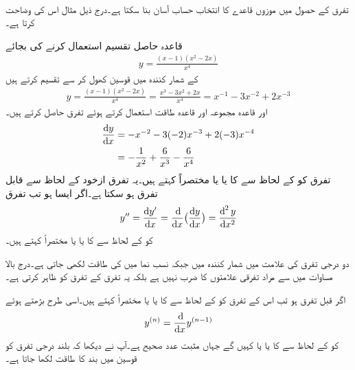 \\
تفرق کے حصول میں موزوں قاعدے کا انتخاب حساب آسان بنا سکتا ہے۔درج ذیل مثال اس کی وضاحت کرتا ہے۔ 

قاعدہ حاصل تقسیم استعمال کرنے کی بجائے
\begin{align*}
y=\frac{(x-1)(x^2-2x)}{x^4}
\end{align*}
کے شمار کنندہ میں قوسین کھول کر  سے تقسیم کرتے ہیں
\begin{align*}
y=\frac{(x-1)(x^2-2x)}{x^4}=\frac{x^3-3x^2+2x}{x^4}=x^{-1}-3x^{-2}+2x^{-3}
\end{align*}
اور قاعدہ مجموعہ اور قاعدہ طاقت استعمال کرتے ہوئے تفرق حاصل کرتے ہیں۔
\begin{align*}
\frac{\dif y}{\dif x}&=-x^{-2}-3(-2)x^{-3}+2(-3)x^{-4}\\
&=-\frac{1}{x^2}+\frac{6}{x^3}-\frac{6}{x^4}
\end{align*}
تفرق  کو  کے لحاظ سے  کا  یا  یا مختصراً  کہتے ہیں۔یہ تفرق ازخود  کے لحاظ سے قابل تفرق ہو سکتا ہے۔اگر ایسا ہو تب تفرق
\begin{align*}
y''=\frac{\dif y'}{\dif x}=\frac{\dif}{\dif x}\big(\frac{\dif y}{\dif x}\big)=\frac{\dif^{\,2} y}{\dif x^2}
\end{align*}
کو  کے لحاظ سے  کا  یا  یا مختصراً  کہتے ہیں۔

دو درجی تفرق کی علامت   میں شمار کنندہ میں  جبکہ نسب نما میں  کی طاقت  لکھی جاتی ہے۔درج بالا مساوات میں  سے مراد تفرقی علامتوں کا ضرب نہیں ہے بلکہ یہ تفرق کے تفرق کو ظاہر کرتی ہے۔

اگر  قبل تفرق ہو تب اس کے تفرق  کو  کے لحاظ سے  کا  یا  یا مختصراً  کہتے ہیں۔اسی طرح بڑھتے ہوئے
\begin{align*}
y^{(n)}=\frac{\dif}{\dif x}y^{(n-1)}
\end{align*}
کو  کے لحاظ سے  کا  یا  یا  کہیں گے جہاں  مثبت عدد صحیح ہے۔آپ نے دیکھا کہ بلند درجی تفرق کو قوسین میں بند  کا طاقت لکھا جاتا ہے۔

